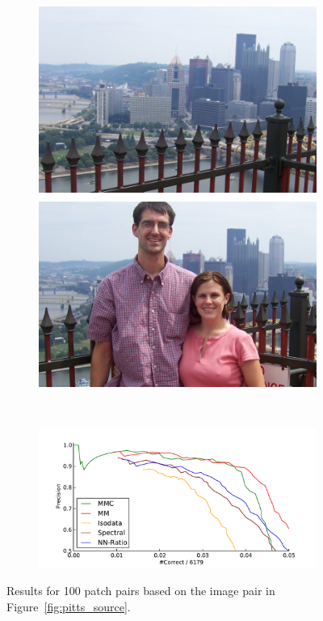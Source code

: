\begin{figure}[htb]
	\begin{subfigure}[c]{.2\textwidth}
		\centering
		\includegraphics[width=\textwidth]{images/pitts}
	\end{subfigure}%
	~%
	\begin{subfigure}[c]{.8\textwidth}
	\centering
	\includegraphics[width=1\columnwidth]{images/result_pitts}
	\end{subfigure}%
	\caption{Results for 100 patch pairs based on the image pair in 
	Figure~\ref{fig:pitts_source}.}
	\label{fig:result_pitts}
\end{figure}

